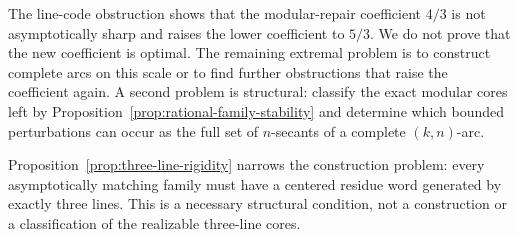 The line-code obstruction shows that the modular-repair coefficient
\(4/3\) is not asymptotically sharp and raises the lower coefficient to
\(5/3\).  We do not prove that the new coefficient is optimal.  The
remaining extremal problem is to construct complete arcs on this scale or to
find further obstructions that raise the coefficient again.  A second problem
is structural: classify the exact modular cores left by
Proposition~\ref{prop:rational-family-stability} and determine which bounded
perturbations can occur as the full set of \(n\)-secants of a complete
\((k,n)\)-arc.

Proposition~\ref{prop:three-line-rigidity} narrows the construction problem:
every asymptotically matching family must have a centered residue word
generated by exactly three lines.  This is a necessary structural condition,
not a construction or a classification of the realizable three-line cores.
